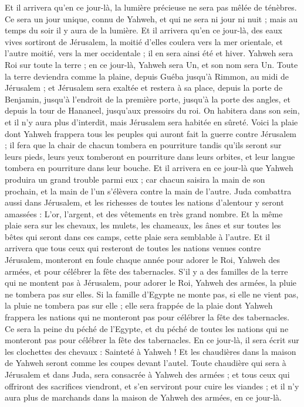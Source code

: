 \begin{multicols}{2}
Et il arrivera qu'en ce jour-là, la lumière précieuse ne sera pas mêlée de ténèbres.
Ce sera un jour unique, connu de Yahweh, et qui ne sera ni jour ni nuit ; mais au temps du soir il y aura de la lumière.
Et il arrivera qu'en ce jour-là, des eaux vives sortiront de Jérusalem, la moitié d'elles coulera vers la mer orientale, et l'autre moitié, vers la mer occidentale ; il en sera ainsi été et hiver.
Yahweh sera Roi sur toute la terre ; en ce jour-là, Yahweh sera Un, et son nom sera Un.
Toute la terre deviendra comme la plaine, depuis Guéba jusqu'à Rimmon, au midi de Jérusalem ; et Jérusalem sera exaltée et restera à sa place, depuis la porte de Benjamin, jusqu'à l'endroit de la première porte, jusqu'à la porte des angles, et depuis la tour de Hananeel, jusqu'aux pressoirs du roi.
On habitera dans son sein, et il n'y aura plus d'interdit, mais Jérusalem sera habitée en sûreté.
Voici la plaie dont Yahweh frappera tous les peuples qui auront fait la guerre contre Jérusalem ; il fera que la chair de chacun tombera en pourriture tandis qu’ils seront sur leurs pieds, leurs yeux tomberont en pourriture dans leurs orbites, et leur langue tombera en pourriture dans leur bouche.
Et il arrivera en ce jour-là que Yahweh produira un grand trouble parmi eux ; car chacun saisira la main de son prochain, et la main de l'un s'élèvera contre la main de l'autre.
Juda combattra aussi dans Jérusalem, et les richesses de toutes les nations d'alentour y seront amassées : L'or, l'argent, et des vêtements en très grand nombre.
Et la même plaie sera sur les chevaux, les mulets, les chameaux, les ânes et sur toutes les bêtes qui seront dans ces camps, cette plaie sera semblable à l’autre.
Et il arrivera que tous ceux qui resteront de toutes les nations venues contre Jérusalem, monteront en foule chaque année pour adorer le Roi, Yahweh des armées, et pour célébrer la fête des tabernacles.
S’il y a des familles de la terre qui ne montent pas à Jérusalem, pour adorer le Roi, Yahweh des armées, la pluie ne tombera pas sur elles.
Si la famille d'Egypte ne monte pas, si elle ne vient pas, la pluie ne tombera pas sur elle ; elle sera frappée de la plaie dont Yahweh frappera les nations qui ne monteront pas pour célébrer la fête des tabernacles.
Ce sera la peine du péché de l’Egypte, et du péché de toutes les nations qui ne monteront pas pour célébrer la fête des tabernacles.
En ce jour-là, il sera écrit sur les clochettes des chevaux : Sainteté à Yahweh ! Et les chaudières dans la maison de Yahweh seront comme les coupes devant l'autel.
Toute chaudière qui sera à Jérusalem et dans Juda, sera consacrée à Yahweh des armées ; et tous ceux qui offriront des sacrifices viendront, et s’en serviront pour cuire  les viandes ; et il n'y aura plus de marchands dans la maison de Yahweh des armées, en ce jour-là.
\PPE{}
\end{multicols}
